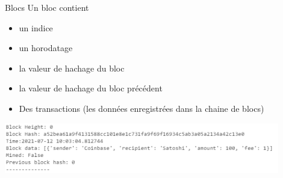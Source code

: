 \documentclass{beamer}
\begin{document}
\begin{frame}{Blocs}
Un bloc contient
\begin{itemize}
  \item un indice 
  \item un horodatage
  \item la valeur de hachage du bloc
  \item la valeur de hachage du bloc précédent
  \item Des transactions (les données enregistrées dans la chaine de blocs)
\end{itemize}
\begin{center}
\includegraphics[width=0.9\textwidth]{../../Figures/genesis_block.png}
\end{center}
\end{frame}
\end{document}
